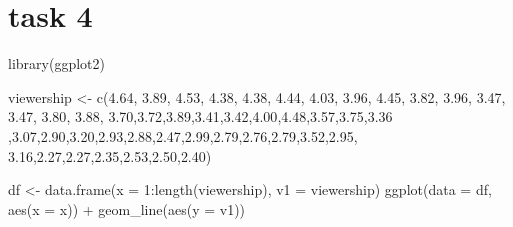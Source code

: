 \documentclass[
  letterpaper,
  DIV=11,
  numbers=noendperiod]{scrartcl}
\newenvironment{Shaded}{\begin{snugshade}}{\end{snugshade}}
\newcommand{\AttributeTok}[1]{\textcolor[rgb]{0.40,0.45,0.13}{#1}}
\newcommand{\DecValTok}[1]{\textcolor[rgb]{0.68,0.00,0.00}{#1}}
\newcommand{\FloatTok}[1]{\textcolor[rgb]{0.68,0.00,0.00}{#1}}
\newcommand{\FunctionTok}[1]{\textcolor[rgb]{0.28,0.35,0.67}{#1}}
\newcommand{\NormalTok}[1]{\textcolor[rgb]{0.00,0.23,0.31}{#1}}
\newcommand{\OtherTok}[1]{\textcolor[rgb]{0.00,0.23,0.31}{#1}}
\newcommand{\SpecialCharTok}[1]{\textcolor[rgb]{0.37,0.37,0.37}{#1}}
\begin{document}
\hypertarget{task-4}{%
\section{task 4}\label{task-4}}

\begin{Shaded}
\begin{Highlighting}[]
\FunctionTok{library}\NormalTok{(ggplot2)}

\NormalTok{viewership }\OtherTok{\textless{}{-}} \FunctionTok{c}\NormalTok{(}\FloatTok{4.64}\NormalTok{, }\FloatTok{3.89}\NormalTok{, }\FloatTok{4.53}\NormalTok{, }\FloatTok{4.38}\NormalTok{, }\FloatTok{4.38}\NormalTok{, }\FloatTok{4.44}\NormalTok{, }\FloatTok{4.03}\NormalTok{, }\FloatTok{3.96}\NormalTok{, }\FloatTok{4.45}\NormalTok{, }\FloatTok{3.82}\NormalTok{, }\FloatTok{3.96}\NormalTok{, }\FloatTok{3.47}\NormalTok{, }\FloatTok{3.47}\NormalTok{, }\FloatTok{3.80}\NormalTok{, }\FloatTok{3.88}\NormalTok{, }\FloatTok{3.70}\NormalTok{,}\FloatTok{3.72}\NormalTok{,}\FloatTok{3.89}\NormalTok{,}\FloatTok{3.41}\NormalTok{,}\FloatTok{3.42}\NormalTok{,}\FloatTok{4.00}\NormalTok{,}\FloatTok{4.48}\NormalTok{,}\FloatTok{3.57}\NormalTok{,}\FloatTok{3.75}\NormalTok{,}\FloatTok{3.36}
\NormalTok{                 ,}\FloatTok{3.07}\NormalTok{,}\FloatTok{2.90}\NormalTok{,}\FloatTok{3.20}\NormalTok{,}\FloatTok{2.93}\NormalTok{,}\FloatTok{2.88}\NormalTok{,}\FloatTok{2.47}\NormalTok{,}\FloatTok{2.99}\NormalTok{,}\FloatTok{2.79}\NormalTok{,}\FloatTok{2.76}\NormalTok{,}\FloatTok{2.79}\NormalTok{,}\FloatTok{3.52}\NormalTok{,}\FloatTok{2.95}\NormalTok{,}
                 \FloatTok{3.16}\NormalTok{,}\FloatTok{2.27}\NormalTok{,}\FloatTok{2.27}\NormalTok{,}\FloatTok{2.35}\NormalTok{,}\FloatTok{2.53}\NormalTok{,}\FloatTok{2.50}\NormalTok{,}\FloatTok{2.40}\NormalTok{)}

\NormalTok{df }\OtherTok{\textless{}{-}} \FunctionTok{data.frame}\NormalTok{(}\AttributeTok{x =} \DecValTok{1}\SpecialCharTok{:}\FunctionTok{length}\NormalTok{(viewership), }\AttributeTok{v1 =}\NormalTok{ viewership)}
\FunctionTok{ggplot}\NormalTok{(}\AttributeTok{data =}\NormalTok{ df, }\FunctionTok{aes}\NormalTok{(}\AttributeTok{x =}\NormalTok{ x)) }\SpecialCharTok{+}
  \FunctionTok{geom\_line}\NormalTok{(}\FunctionTok{aes}\NormalTok{(}\AttributeTok{y =}\NormalTok{ v1)) }
\end{Highlighting}
\end{Shaded}
\end{document}
